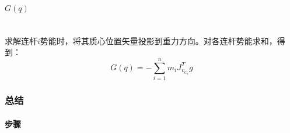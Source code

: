 \documentclass[
12pt, %
a4paper, 
oneside, %
headinclude,footinclude, %
]{scrartcl}
\begin{document}
\begin{itemize}
$$$$
\end{itemize}
\paragraph{$ G(q) $}~\\

求解连杆$ i $势能时，将其质心位置矢量投影到重力方向。对各连杆势能求和，得到：
$$ G(q) = -\sum_{i = 1}^{n} m_i J_{v_{C_i}}^T g $$
\subsubsection[总结]{总结}
\paragraph{步骤}
\end{document}

